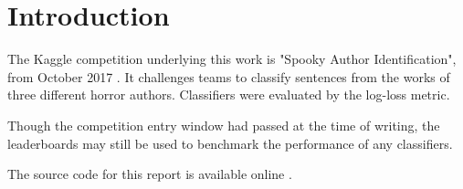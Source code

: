 \section{Introduction}
\label{sec:intro}
The Kaggle competition underlying this work is "Spooky Author Identification", from October 2017 \cite{kaggle}. It challenges teams to classify sentences from the works of three
different horror authors. Classifiers were evaluated by the log-loss metric.

Though the competition entry window had passed at the time of writing, the leaderboards may still be used to benchmark the performance of any classifiers.

The source code for this report is available online \cite{source-code}.

